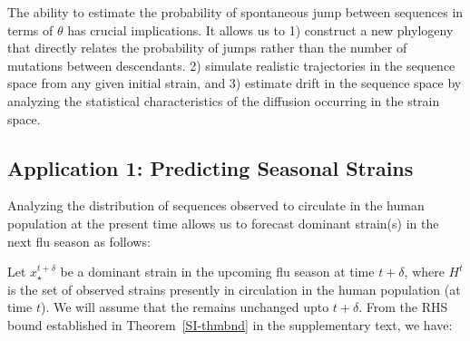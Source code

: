 {The ability to estimate the probability of spontaneous jump between sequences in terms of $\theta$ has  crucial implications. It allows us to 1) construct  a new  phylogeny that directly relates the probability of jumps rather than the number of mutations  between descendants. 2) simulate realistic trajectories in the sequence space from any given initial strain, and 3) estimate drift in the sequence space  by analyzing the statistical characteristics of the diffusion occurring in the strain space.





\subsection*{Application 1: Predicting Seasonal Strains}

Analyzing the distribution of sequences observed to circulate in the human population at the present time allows us to forecast dominant strain(s) in the next flu season as follows:




\def\E{\mathcal{E}}
\def\dst{x_\star^{t+\delta}}
\def\dsta{x^{t+\delta}}

Let $\dst$ be a dominant strain in the upcoming flu season at time $t+\delta$,
where $H^t$ is the set of observed strains presently in circulation in the human population (at time $t$). We will assume that the \enet  remains unchanged upto $t+\delta$.
From the RHS bound established in Theorem~\ref{SI-thmbnd} in the supplementary text, we have:

}
